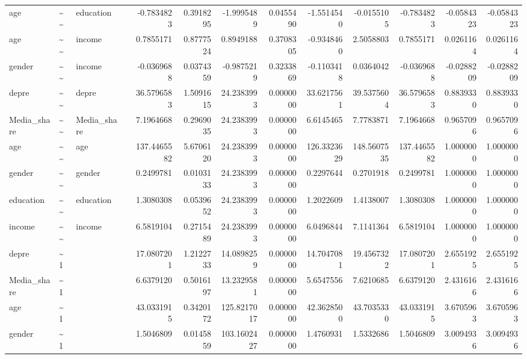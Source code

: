 \documentclass[
]{article}
\begin{document}
\begin{table}[!h]
\begin{tabular}[t]{llllrrrrrrrrr}
age & \textasciitilde{}\textasciitilde{} & education &  & -0.7834823 & 0.3918295 & -1.9995489 & 0.0455490 & -1.5514540 & -0.0155105 & -0.7834823 & -0.0584323 & -0.0584323\\
age & \textasciitilde{}\textasciitilde{} & income &  & 0.7855171 & 0.8777524 & 0.8949188 & 0.3708305 & -0.9348460 & 2.5058803 & 0.7855171 & 0.0261164 & 0.0261164\\
gender & \textasciitilde{}\textasciitilde{} & income &  & -0.0369688 & 0.0374359 & -0.9875219 & 0.3233869 & -0.1103418 & 0.0364042 & -0.0369688 & -0.0288209 & -0.0288209\\
\addlinespace
depre & \textasciitilde{}\textasciitilde{} & depre &  & 36.5796583 & 1.5091615 & 24.2383993 & 0.0000000 & 33.6217561 & 39.5375604 & 36.5796583 & 0.8839330 & 0.8839330\\
Media\_share & \textasciitilde{}\textasciitilde{} & Media\_share &  & 7.1964668 & 0.2969035 & 24.2383993 & 0.0000000 & 6.6145465 & 7.7783871 & 7.1964668 & 0.9657096 & 0.9657096\\
age & \textasciitilde{}\textasciitilde{} & age &  & 137.4465582 & 5.6706120 & 24.2383993 & 0.0000000 & 126.3323629 & 148.5607535 & 137.4465582 & 1.0000000 & 1.0000000\\
gender & \textasciitilde{}\textasciitilde{} & gender &  & 0.2499781 & 0.0103133 & 24.2383993 & 0.0000000 & 0.2297644 & 0.2701918 & 0.2499781 & 1.0000000 & 1.0000000\\
education & \textasciitilde{}\textasciitilde{} & education &  & 1.3080308 & 0.0539652 & 24.2383993 & 0.0000000 & 1.2022609 & 1.4138007 & 1.3080308 & 1.0000000 & 1.0000000\\
\addlinespace
income & \textasciitilde{}\textasciitilde{} & income &  & 6.5819104 & 0.2715489 & 24.2383993 & 0.0000000 & 6.0496844 & 7.1141364 & 6.5819104 & 1.0000000 & 1.0000000\\
depre & \textasciitilde{}1 &  &  & 17.0807201 & 1.2122733 & 14.0898259 & 0.0000000 & 14.7047081 & 19.4567322 & 17.0807201 & 2.6551925 & 2.6551925\\
Media\_share & \textasciitilde{}1 &  &  & 6.6379120 & 0.5016197 & 13.2329581 & 0.0000000 & 5.6547556 & 7.6210685 & 6.6379120 & 2.4316166 & 2.4316166\\
age & \textasciitilde{}1 &  &  & 43.0331915 & 0.3420172 & 125.8217017 & 0.0000000 & 42.3628500 & 43.7035330 & 43.0331915 & 3.6705963 & 3.6705963\\
gender & \textasciitilde{}1 &  &  & 1.5046809 & 0.0145859 & 103.1602427 & 0.0000000 & 1.4760931 & 1.5332686 & 1.5046809 & 3.0094936 & 3.0094936\\

\end{tabular}
\end{table}
\end{document}

